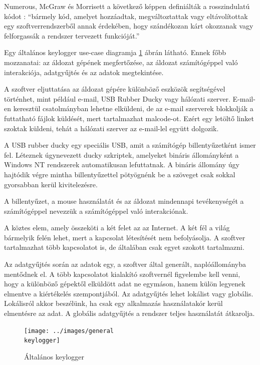 \documentclass[12pt,a4paper,oneside]{report}
\begin{document}
Numerous, McGraw és Morrisett a következő képpen definiálták a rosszindulatú kódot \cite{ahmed2014survey}: ``bármely kód, amelyet hozzáadtak, megváltoztattak vagy eltávolítottak egy szoftverrendszerből annak érdekében, hogy szándékozan kárt okozzanak vagy felforgassák a rendszer tervezett funkcióját.''

Egy általános keylogger use-case diagramja \ref{fig:genkeylogger} ábrán látható. Ennek főbb mozzanatai: az áldozat gépének megfertőzése, az áldozat számítógéppel való interakciója, adatgyűjtés és az adatok megtekintése.

A szoftver eljuttatása az áldozat gépére különböző eszközök segítségével történhet, mint például e-mail, USB Rubber Ducky vagy hálózati szerver. E-mail-en keresztül csatolmányban lehetne elküldeni, de az e-mail szerverek blokkolják a futtatható fájlok küldését, mert tartalmazhat malcode-ot. Ezért egy letöltő linket szoktak küldeni, tehát a hálózati szerver az e-mail-lel együtt dolgozik.

A USB rubber ducky egy speciális USB, amit a számítógép billentyűzetként ismer fel. Léteznek úgynevezett ducky szkriptek, amelyeket bináris állományként a Windows NT rendszerek automatikusan lefuttatnak. A bináris állomány úgy hajtódik végre mintha billentyűzettel pötyögnénk be a szöveget csak sokkal gyorsabban kerül kivitelezésre.

A billentyűzet, a mouse használatát és az áldozat mindennapi tevékenységét a számítógéppel nevezzük a számítógéppel való interakciónak.

A köztes elem, amely összeköti a két felet az az Internet. A két fél a világ bármelyik felén lehet, mert a kapcsolat létesítését nem befolyásolja. A szoftver tartalmazhat több kapcsolatot is, de általában csak egyet szokott tartalmazni.

Az adatgyűjtés során az adatok egy, a szoftver által generált, naplóállományba mentődnek el. A több kapcsolatot kialakító szoftvernél figyelembe kell venni, hogy a különböző gépektől elküldött adat ne egymáson, hanem külön legyenek elmentve a kiértékelés szempontjából. Az adatgyűjtés lehet lokálist vagy globális. Lokálisról akkor beszélünk, ha csak egy alkalmazás használatakór kerül elmentésre az adat. A globális adatgyűjtés a rendszer teljes használatát átkarolja.

\begin{figure}[H]
\centering
\texttt{[image: ../images/general\\ keylogger]}
\caption{Általános keylogger}
\label{fig:genkeylogger}
\end{figure}
\end{document}
